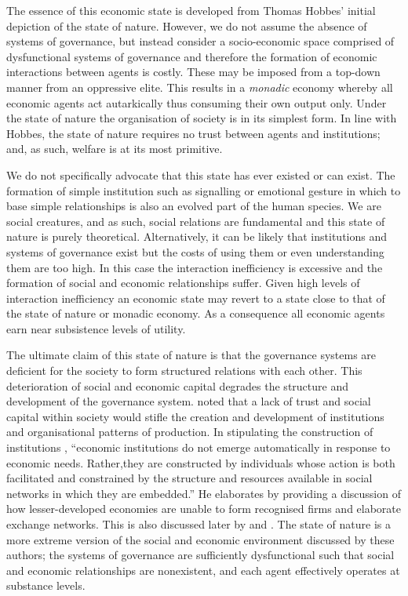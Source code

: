 The essence of this economic state is developed from Thomas Hobbes' initial depiction of the state of nature. However, we do not assume the absence of systems of governance, but instead consider a socio-economic space comprised of dysfunctional systems of governance and therefore the formation of economic interactions between agents is costly. These may be imposed from a top-down manner from an oppressive elite. This results in a \emph{monadic} economy whereby all economic agents act autarkically thus consuming their own output only. Under the state of nature the organisation of society is in its simplest form. In line with Hobbes, the state of nature requires no trust between agents and institutions; and, as such, welfare is at its most primitive.

We do not specifically advocate that this state has ever existed or can exist. The formation of simple institution such as signalling or emotional gesture in which to base simple relationships is also an evolved part of the human species. We are social creatures, and as such, social relations are fundamental and this state of nature is purely theoretical. Alternatively, it can be likely that institutions and systems of governance exist but the costs of using them or even understanding them are too high. In this case the interaction inefficiency is excessive and the formation of social and economic relationships suffer. Given high levels of interaction inefficiency an economic state may revert to a state close to that of the state of nature or monadic economy. As a consequence all economic agents earn near subsistence levels of utility. 

The ultimate claim of this state of nature is that the governance systems are deficient for the society to form structured relations with each other. This deterioration of social and economic capital degrades the structure and development of the governance system. \citet{Granovetter1992} noted that a lack of trust and social capital within society would stifle the creation and development of institutions and organisational patterns of production. In stipulating the construction of institutions \citet[p.~7]{Granovetter1992}, ``economic institutions do not emerge automatically in response to economic needs. Rather,they are constructed by individuals whose action is both facilitated and constrained by the structure and resources available in social networks in which they are embedded.'' He elaborates by providing a discussion of how lesser-developed economies are unable to form recognised firms and elaborate exchange networks. This is also discussed later by \citet{deSoto2001} and \citet{AcemogluRobinson2012}. The state of nature is a more extreme version of the social and economic environment discussed by these authors; the systems of governance are sufficiently dysfunctional such that social and economic relationships are nonexistent, and each agent effectively operates at substance levels.

